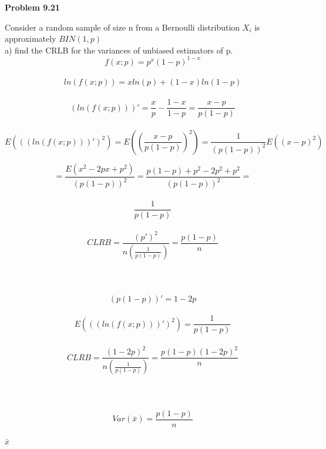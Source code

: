 
{\bf Problem 9.21}

Consider a random sample of size n from a Bernoulli distribution $X_{i}$ is approximately $BIN(1,p)$
\\
a) find the CRLB for the variances of unbiased estimators of p.
\\ \[f(x;p)=p^{x}(1-p)^{1-x}\]
\\ \[ ln(f(x;p)) = xln(p)+(1-x)ln(1-p) \]
\\ \[ (ln(f(x;p)))' = \frac{x}{p} - \frac{1-x}{1-p} = \frac{x-p}{p(1-p)} \]
\\ \[ E(((ln(f(x;p)))')^{2}) = E((\frac{x-p}{p(1-p)})^{2}) = \frac{1}{(p(1-p))^{2}}E((x-p)^{2}) \]

\[	= \frac{E(x^{2}-2px+p^{2})}{(p(1-p))^{2}} = \frac{p(1-p) +p^{2}-2p^{2}+p^{2}}{(p(1-p))^{2}} = \]
\\\[ \frac{1}{p(1-p)} \]
\\ \[  CLRB = \frac{(p')^{2}}{n(\frac{1}{p(1-p)})} = \frac{p(1-p)}{n} \]
\\
\\ 
\\ \[ (p(1-p))' = 1-2p \]
\\ \[ E(((ln(f(x;p)))')^{2}) = \frac{1}{p(1-p)} \]
\\ \[ CLRB = \frac{(1-2p)^{2}}{n(\frac{1}{p(1-p)})} = \frac{p(1-p)(1-2p)^{2}}{n} \]
\\
\\ 
\\ \[ Var(\bar{x}) = \frac{p(1-p)}{n} \]
\\  $\bar{x}$ 
